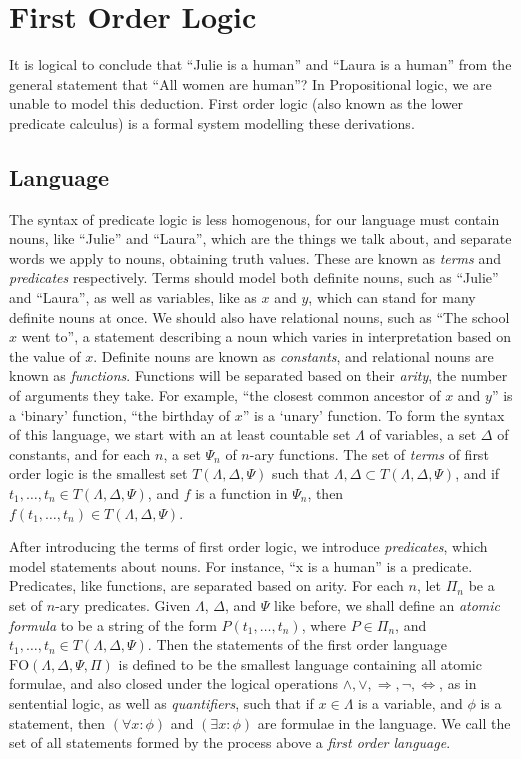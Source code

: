 \chapter{First Order Logic}

It is logical to conclude that ``Julie is a human'' and ``Laura is a human'' from the general statement that ``All women are human''? In Propositional logic, we are unable to model this deduction. First order logic (also known as the lower predicate calculus) is a formal system modelling these derivations.

\section{Language}

The syntax of predicate logic is less homogenous, for our language must contain nouns, like ``Julie'' and ``Laura'', which are the things we talk about, and separate words we apply to nouns, obtaining truth values. These are known as \emph{terms} and \emph{predicates} respectively. Terms should model both definite nouns, such as ``Julie'' and ``Laura'', as well as variables, like as $x$ and $y$, which can stand for many definite nouns at once. We should also have relational nouns, such as ``The school $x$ went to'', a statement describing a noun which varies in interpretation based on the value of $x$. Definite nouns are known as \emph{constants}, and relational nouns are known as \emph{functions}. Functions will be separated based on their \emph{arity}, the number of arguments they take. For example, ``the closest common ancestor of $x$ and $y$'' is a `binary' function, ``the birthday of $x$'' is a `unary' function. To form the syntax of this language, we start with an at least countable set $\Lambda$ of variables, a set $\Delta$ of constants, and for each $n$, a set $\Psi_n$ of $n$-ary functions. The set of \emph{terms} of first order logic is the smallest set $T(\Lambda, \Delta, \Psi)$ such that $\Lambda, \Delta \subset T(\Lambda, \Delta, \Psi)$, and if $t_1, \dots, t_n \in T(\Lambda, \Delta, \Psi)$, and $f$ is a function in $\Psi_n$, then $f(t_1, \dots, t_n) \in T(\Lambda, \Delta, \Psi)$.

After introducing the terms of first order logic, we introduce \emph{predicates}, which model statements about nouns. For instance, ``x is a human'' is a predicate. Predicates, like functions, are separated based on arity. For each $n$, let $\Pi_n$ be a set of $n$-ary predicates. Given $\Lambda$, $\Delta$, and $\Psi$ like before, we shall define an \emph{atomic formula} to be a string of the form $P(t_1, \dots, t_n)$, where $P \in \Pi_n$, and $t_1, \dots, t_n \in T(\Lambda, \Delta, \Psi)$. Then the statements of the first order language $\text{FO}(\Lambda, \Delta, \Psi, \Pi)$ is defined to be the smallest language containing all atomic formulae, and also closed under the logical operations $\wedge, \vee, \Rightarrow, \neg, \Leftrightarrow$, as in sentential logic, as well as \emph{quantifiers}, such that if $x \in \Lambda$ is a variable, and $\phi$ is a statement, then $(\forall x: \phi)$ and $(\exists x: \phi)$ are formulae in the language. We call the set of all statements formed by the process above a \emph{first order language}.

